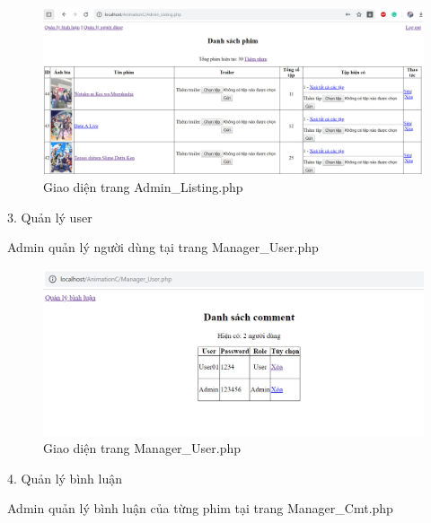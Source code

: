 \documentclass{report}
\begin{document}
\begin{center}
    \begin{figure}[htp]
    \begin{center}
     \includegraphics[scale=0.45]{8.png}
    \end{center}
    \caption{Giao diện trang Admin\_Listing.php}
    \label{refhinh1}
    \end{figure}
\end{center}

\bigskip
\changefontsizes{14pt}
\setlength{\parindent}{0cm}
3. Quản lý user

\changefontsizes{13pt}
\setlength{\parindent}{1cm}
Admin quản lý người dùng tại trang Manager\_User.php

\begin{center}
    \begin{figure}[htp]
    \begin{center}
     \includegraphics[scale=0.6]{9.png}
    \end{center}
    \caption{Giao diện trang Manager\_User.php}
    \label{refhinh1}
    \end{figure}
\end{center}

\bigskip
\changefontsizes{14pt}
\setlength{\parindent}{0cm}
4. Quản lý bình luận

\changefontsizes{13pt}
\setlength{\parindent}{1cm}
Admin quản lý bình luận của từng phim tại trang Manager\_Cmt.php
\end{document}
